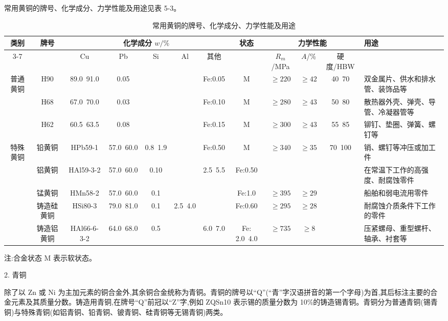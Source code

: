 \documentclass[UTF8]{ctexbook}
\newcommand{\◎}{\ensuremath{\bigcirc}}
\begin{document}
常用黄铜的牌号、化学成分、力学性能及用途见表 5-3。

\begin{table}[H]
\centering
\caption{常用黄铜的牌号、化学成分、力学性能及用途}
\label{tab:brass_properties}
\footnotesize\setlength{\tabcolsep}{2pt}
\begin{tabular}{|c|c|c|c|c|c|c|c|c|c|c|p{3cm}|}
\hline
\multirow{2}{*}{类别} & \multirow{2}{*}{牌号} & \multicolumn{5}{c|}{化学成分 $w/\%$} & \multirow{2}{*}{状态} & \multicolumn{3}{c|}{力学性能} & \multirow{2}{3cm}{用途} \\
\cline{3-7}\cline{9-11}
 & & Cu & Pb & Si & Al & 其他 & & $R_m$/MPa & $A$/\% & 硬度/HBW & \\
\hline
\multirow{3}{*}{普通黄铜} & H90 & 89.0~91.0 & 0.05 & & & Fe:0.05 & M & $\geqslant 220$ & $\geqslant 42$ & 40~70 & 双金属片、供水和排水管、装饰品等 \\
\cline{2-12}
 & H68 & 67.0~70.0 & 0.03 & & & Fe:0.10 & M & $\geqslant 280$ & $\geqslant 43$ & 50~80 & 散热器外壳、弹壳、导管、冷凝器管等 \\
\cline{2-12}
 & H62 & 60.5~63.5 & 0.08 & & & Fe:0.15 & M & $\geqslant 300$ & $\geqslant 43$ & 55~85 & 铆钉、垫圈、弹簧、螺钉等 \\
\hline
\multirow{5}{*}{特殊黄铜} & 铅黄铜 & HPb59-1 & 57.0~60.0 & 0.8~1.9 & & Fe:0.50 & M & $\geqslant 340$ & $\geqslant 35$ & 70~100 & 销、螺钉等冲压或加工件 \\
\cline{2-12}
 & 铝黄铜 & HAl59-3-2 & 57.0~60.0 & 0.10 & & 2.5~5.5 & Fe:0.50 & & & & 在常温下工作的高强度、耐腐蚀零件 \\
\cline{2-12}
 & 锰黄铜 & HMn58-2 & 57.0~60.0 & 0.1 & & & Fe:1.0 & $\geqslant 395$ & $\geqslant 29$ & & 船舶和弱电流用零件 \\
\cline{2-12}
 & 铸造硅黄铜 & HSi80-3 & 79.0~81.0 & 0.1 & 2.5~4.0 & & Fe:0.60 & $\geqslant 295$ & $\geqslant 28$ & & 耐腐蚀介质条件下工作的零件 \\
\cline{2-12}
 & 铸造铝黄铜 & HAl66-6-3-2 & 64.0~68.0 & 0.5 & & 6.0~7.0 & Fe: 2.0~4.0 & $\geqslant 735$ & $\geqslant 8$ & & 压紧螺母、重型螺杆、轴承、衬套等 \\
\hline
\end{tabular}
\begin{tablenotes}
	\item 注:合金状态 M 表示软状态。
\end{tablenotes}
\end{table}

2. 青铜

除了以 Zn 或 Ni 为主加元素的铜合金外,其余铜合金统称为青铜。青铜的牌号以“Q”(“青”字汉语拼音的第一个字母)为首,其后标注主要的合金元素及其质量分数。铸造用青铜,在牌号“Q”前冠以“Z”字,例如 ZQSn10 表示锡的质量分数为 10\%的铸造锡青铜。青铜分为普通青铜(锡青铜)与特殊青铜(如铝青铜、铅青铜、铍青铜、硅青铜等无锡青铜)两类。
\end{document}
